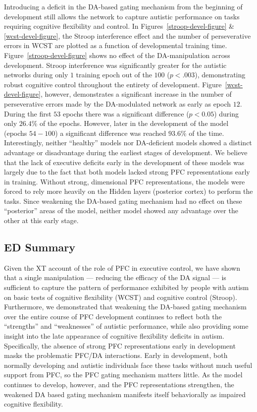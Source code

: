 \documentclass[man]{apa}
\begin{document}
Introducing a deficit in the DA-based gating mechanism from the
beginning of development still allows the network to capture autistic
performance on tasks requiring cognitive flexibility and control.  In
Figures~\ref{stroop-devel-figure} \& \ref{wcst-devel-figure}, the
Stroop interference effect and the number of perseverative errors in
WCST are plotted as a function of developmental training time.
Figure~\ref{stroop-devel-figure} shows no effect of the
DA-manipulation across development.  Stroop interference was
significantly greater for the autistic networks during only $1$ training epoch
out of the $100$ ($p<.003$), demonstrating robust cognitive control
throughout the entirety of development.
Figure~\ref{wcst-devel-figure}, however, demonstrates a significant
increase in the number of perseverative errors made by the
DA-modulated network as early as epoch $12$.  During the first $53$
epochs there was a significant difference ($p < 0.05$) during only
$26.4\%$ of the epochs.  However, later in the development of the
model (epochs $54-100$) a significant difference was reached $93.6\%$
of the time.  Interestingly, neither ``healthy'' models nor
DA-deficient models showed a distinct advantage or disadvantage during
the earliest stages of development.  We believe that the lack of
executive deficits early in the development of these models was
largely due to the fact that both models lacked strong PFC
representations early in training.  Without strong, dimensional PFC
representations, the models were forced to rely more heavily on the
Hidden layers (posterior cortex) to perform the tasks.  Since
weakening the DA-based gating mechanism had no effect on these
``posterior'' areas of the model, neither model showed any advantage
over the other at this early stage.

\subsection{ED Summary}

Given the XT account of the role of PFC in executive control, we have shown that a single manipulation --- reducing the efficacy of the DA signal --- is sufficient to capture the pattern of performance exhibited by people with autism on basic tests of cognitive flexibility (WCST) and cognitive control (Stroop).  Furthermore, we demonstrated that weakening the DA-based gating mechanism over the entire course of PFC development continues to reflect both the ``strengths'' and ``weaknesses'' of autistic performance, while also providing some insight into the late appearance of cognitive flexibility deficits in autism.  Specifically, the absence of strong PFC representations early in development masks the problematic PFC/DA interactions.  Early in development, both normally developing and autistic individuals face these tasks without much useful support from PFC, so the PFC gating mechanism matters little.  As the model continues to develop, however, and the PFC representations strengthen, the weakened DA based gating mechanism manifests itself behaviorally as impaired cognitive flexibility.
\end{document}
